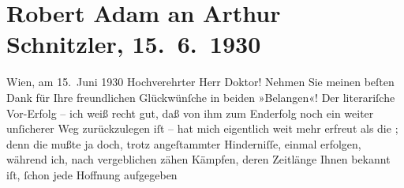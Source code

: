 

         \renewcommand{\erwaehnteInstitutionen}{Institutionen: Drei Masken-Verlag, Handelsgericht Wien}
         \renewcommand{\erwaehnteOrte}{Orte: Berlin, Wien}
         \renewcommand{\erwaehnteWerke}{Werke: Margot und das Jugendgericht}
               \section[Robert Adam an Arthur Schnitzler, 15. 6. 1930]{ Robert Adam an Arthur Schnitzler, 15. 6. 1930}\nopagebreak{}\rehead{ }\begin{ledgroupsized}[t]{13cm}\normalsize\beginnumbering \toendnotes[C]{\smallbreak\pagebreak[2]} 
\toendnotes[C]{\smallbreak}\pstart
           \raggedleft{}{\pb}Wien, am 15. Juni 1930\pend
           \pstart{}Hochverehrter Herr Doktor!\pend\pstart
           Nehmen Sie meinen beſten Dank für Ihre freundlichen Glückwünſche in beiden
                    »Belangen«!\pend
           \pstart
           Der literariſche Vor-Erfolg – ich weiß recht gut, daß von ihm zum Enderfolg noch
                    ein weiter unſicherer Weg zurückzulegen iſt – hat mich eigentlich weit mehr
                    erfreut als die \label{K_L02538_1v}\label{K_L02538_1h}; denn die mußte ja doch, trotz
                    angeſtammter Hinderniſſe, einmal erfolgen, während ich, nach vergeblichen zähen
                    Kämpfen, deren Zeitlänge Ihnen bekannt iſt, ſchon jede Hoffnung aufgegeben

\end{ledgroupsized}
